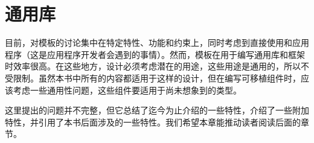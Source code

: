 \chapter{通用库}
目前，对模板的讨论集中在特定特性、功能和约束上，同时考虑到直接使用和应用程序（这是应用程序开发者会遇到的事情）。然而，模板在用于编写通用库和框架时效率很高。在这些地方，设计必须考虑潜在的用途，这些用途是通用的，所以不受限制。虽然本书中所有的内容都适用于这样的设计，但在编写可移植组件时，应该考虑一些通用性问题，这些组件要适用于尚未想象到的类型。

这里提出的问题并不完整，但它总结了迄今为止介绍的一些特性，介绍了一些附加特性，并引用了本书后面涉及的一些特性。我们希望本章能推动读者阅读后面的章节。






